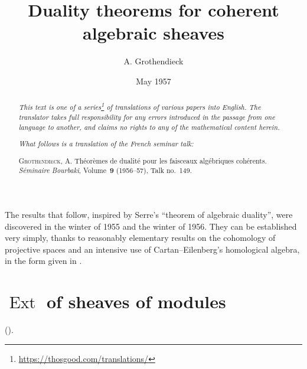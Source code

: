 \documentclass{article}
\title{Duality theorems for coherent algebraic sheaves}
\author{A. Grothendieck}
\date{May 1957}
\theoremstyle{plain}
\theoremstyle{definition}
\DeclareMathOperator{\Ext}{Ext}
\newcommand{\oldpage}[1]{\marginpar{\footnotesize$\Big\vert$ \textit{p.~#1}}}
\begin{document}
\maketitle
\thispagestyle{fancy}

\renewcommand{\abstractname}{Translator's note.}

\begin{abstract}
  \renewcommand*{\thefootnote}{\fnsymbol{footnote}}
  \emph{This text is one of a series\footnote{\url{https://thosgood.com/translations/}} of translations of various papers into English.}
  \emph{The translator takes full responsibility for any errors introduced in the passage from one language to another, and claims no rights to any of the mathematical content herein.}

  \medskip
  
  \emph{What follows is a translation of the French seminar talk:}

  \medskip\noindent
  \textsc{Grothendieck, A.}
  Th\'{e}or\`{e}mes de dualit\'{e} pour les faisceaux alg\'{e}briques coh\'{e}rents.
  \emph{S\'{e}minaire Bourbaki}, Volume~\textbf{9} (1956--57), Talk no.~149.
\end{abstract}

\setcounter{footnote}{0}

\tableofcontents
\bigskip



\oldpage{149-01}
The results that follow, inspired by Serre's ``theorem of algebraic duality'', were discovered in the winter of 1955 and the winter of 1956.
They can be established very simply, thanks to reasonably elementary results on the cohomology of projective spaces \cite{3} and an intensive use of Cartan--Eilenberg's homological algebra, in the form given in \cite{2}.


\section{\texorpdfstring{$\Ext$}{Ext} of sheaves of modules}
\label{section1}

(\cite[chap.~3 and 4]{2}).
\end{document}

